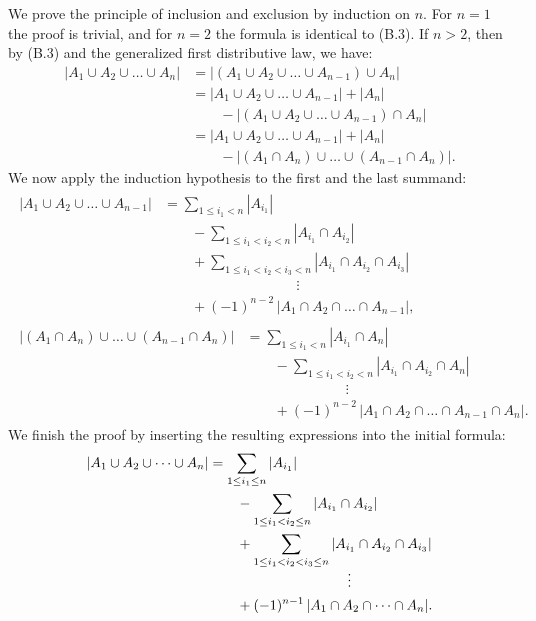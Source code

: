 \starred
We prove the principle of inclusion and exclusion by induction on $n$.
For $n=1$ the proof is trivial, and for $n=2$ the formula is identical to (B.3).
If $n>2$, then by (B.3) and the generalized first distributive law, we have:
\begin{align*}
    |A_1\cup A_2\cup\dots\cup A_n| &= |(A_1\cup A_2\cup\dots\cup A_{n-1})\cup A_n| \\
    &= |A_1\cup A_2\cup\dots\cup A_{n-1}|+|A_n| \\
    &\qquad {}-|(A_1\cup A_2\cup\dots\cup A_{n-1})\cap A_n| \\
    &= |A_1\cup A_2\cup\dots\cup A_{n-1}|+|A_n| \\
    &\qquad {}-|(A_1\cap A_n)\cup\dots\cup(A_{n-1}\cap A_n)|.
\end{align*}
We now apply the induction hypothesis to the first and the last summand:
\begin{gather*}
    \begin{align*}
        |A_1\cup A_2\cup\dots\cup A_{n-1}| &= \sum_{1\le i_1<n}|A_{i_1}| \\
        &\qquad {}-\sum_{1\le i_1<i_2<n}|A_{i_1}\cap A_{i_2}| \\
        &\qquad {}+\sum_{1\le i_1<i_2<i_3<n}|A_{i_1}\cap A_{i_2}\cap A_{i_3}| \\[-2mm]
        &\hspace{4cm}\vdots \\
        &\qquad {}+(-1)^{n-2}\,|A_1\cap A_2\cap\dots\cap A_{n-1}|,
    \end{align*}\\[5mm]
    \begin{align*}
        |(A_1\cap A_n)\cup\dots\cup(A_{n-1}\cap A_n)| &= \sum_{1\le i_1<n}|A_{i_1}\cap A_n| \\
        &\qquad {}-\sum_{1\le i_1<i_2<n}|A_{i_1}\cap A_{i_2}\cap A_n| \\[-2mm]
        &\hspace{3cm}\vdots \\
        &\qquad {}+(-1)^{n-2}\,|A_1\cap A_2\cap\dots\cap A_{n-1}\cap A_n|.
    \end{align*}
\end{gather*}
We finish the proof by inserting the resulting expressions into the initial formula:
\begin{align*}
    |A_1\cup A_2\cup\dots\cup A_n| &= \sum_{1\le i_1\le n}|A_{i_1}| \\
    &\qquad {}-\sum_{1\le i_1<i_2\le n}|A_{i_1}\cap A_{i_2}| \\
    &\qquad {}+\sum_{1\le i_1<i_2<i_3\le n}|A_{i_1}\cap A_{i_2}\cap A_{i_3}| \\[-2mm]
    &\hspace{3.5cm}\vdots \\
    &\qquad {}+(-1)^{n-1}\,|A_1\cap A_2\cap\dots\cap A_n|.
\end{align*}
